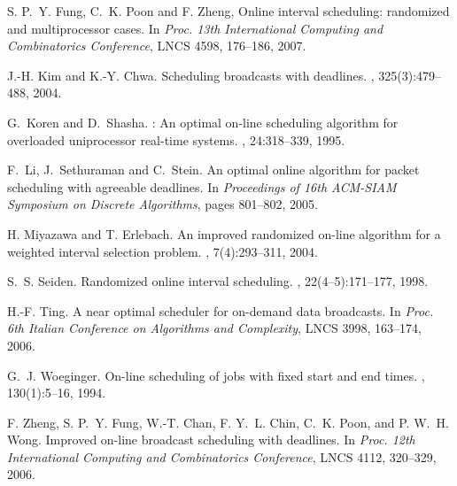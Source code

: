 \documentclass[11pt]{article}
\begin{document}
\begin{thebibliography}{10}
S. P.~Y. Fung, C.~K. Poon and F. Zheng,
\newblock Online interval scheduling: randomized and multiprocessor cases.
\newblock In {\em Proc. 13th International Computing and Combinatorics
Conference}, LNCS 4598, 176--186, 2007.

J.-H. Kim and K.-Y. Chwa.
\newblock Scheduling broadcasts with deadlines.
, 325(3):479--488, 2004.

G.~Koren and D.~Shasha.
\newblock : An optimal on-line scheduling algorithm for overloaded
  uniprocessor real-time systems.
, 24:318--339, 1995.

F.~Li, J.~Sethuraman and C.~Stein.
\newblock An optimal online algorithm for packet scheduling with agreeable deadlines.
\newblock In {\em Proceedings of 16th ACM-SIAM Symposium on Discrete
  Algorithms}, pages 801--802, 2005.



H. Miyazawa and T. Erlebach.
\newblock An improved randomized on-line algorithm for a weighted interval
  selection problem.
, 7(4):293--311, 2004.

S.~S. Seiden.
\newblock Randomized online interval scheduling.
, 22(4--5):171--177, 1998.

H.-F. Ting.
\newblock A near optimal scheduler for on-demand data broadcasts.
\newblock In {\em Proc. 6th Italian Conference on Algorithms and
  Complexity}, LNCS 3998, 163--174, 2006.

G.~J. Woeginger.
\newblock On-line scheduling of jobs with fixed start and end times.
, 130(1):5--16, 1994.

F. Zheng, S. P.~Y. Fung, W.-T. Chan, F. Y.~L. Chin,
  C.~K. Poon, and P. W.~H. Wong.
\newblock Improved on-line broadcast scheduling with deadlines.
\newblock In {\em Proc. 12th International Computing and Combinatorics
  Conference}, LNCS 4112, 320--329, 2006.

\end{thebibliography}
\end{document}
